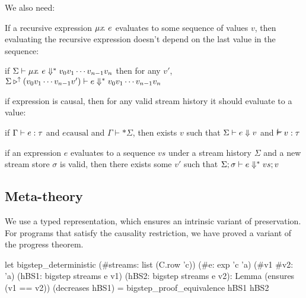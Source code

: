 \documentclass[sigplan,screen]{acmart}
\begin{document}
We also need:
\begin{lemma}
  If a recursive expression $\mu{} x \!.~e$ evaluates to some sequence of values $v$, then evaluating the recursive expression doesn't depend on the last value in the sequence:

  if $\Sigma \vdash \mu{} x \!.~e \Downarrow^{*} v_0 v_1 \cdots v_{n-1} v_n $
  then for any $v'$,
  $\Sigma \triangleright^{\uparrow} (v_0 v_1 \cdots v_{n-1} v') \vdash e \Downarrow^{*} v_0 v_1 \cdots v_{n-1} v_n$
\end{lemma}


\begin{lemma}[progress]
  if expression is causal, then for any valid stream history it should evaluate to a value:

  if $\Gamma \vdash e : \tau$ and $e \mbox{causal}$ and $\Gamma \vdash* \Sigma$, then exists $v$ such that
  $\Sigma \vdash e \Downarrow v$ and $\mtyping{}{v}{\tau}$
\end{lemma}

\begin{lemma}
  if an expression $e$ evaluates to a sequence $vs$ under a stream history $\Sigma$ and a new stream store $\sigma$ is valid, then
  there exists some $v'$ such that
  $\Sigma; \sigma \vdash e \Downarrow^{*} vs; v$
\end{lemma}

\subsection{Meta-theory}
\label{ss:meta-theory}

We use a typed representation, which ensures an intrinsic variant of preservation.
For programs that satisfy the causality restriction, we have proved a variant of the progress theorem.

\begin{code}
let bigstep_deterministic
  (#streams: list (C.row 'c))
  (#e: exp 'c 'a)
  (#v1 #v2: 'a)
  (hBS1: bigstep streams e v1) (hBS2: bigstep streams e v2):
    Lemma (ensures (v1 == v2)) (decreases hBS1) =
  bigstep_proof_equivalence hBS1 hBS2
\end{code}
\end{document}
